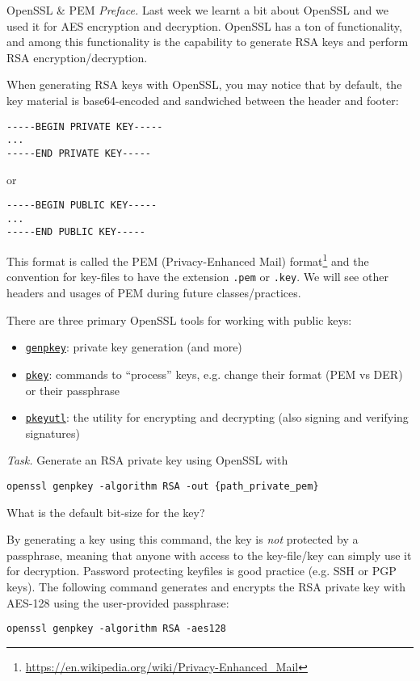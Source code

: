 \documentclass{practice}
\begin{document}
\begin{task}{OpenSSL \& PEM}
  \textit{Preface.}
  Last week we learnt a bit about OpenSSL and we used it for AES encryption and decryption.
  OpenSSL has a ton of functionality, and among this functionality is the capability to generate RSA keys and perform RSA encryption/decryption.

  When generating RSA keys with OpenSSL, you may notice that by default, the key material is base64-encoded and sandwiched between the header and footer:
  \begin{Verbatim}
-----BEGIN PRIVATE KEY-----
...
-----END PRIVATE KEY-----
  \end{Verbatim}
  or
  \begin{Verbatim}
-----BEGIN PUBLIC KEY-----
...
-----END PUBLIC KEY-----
  \end{Verbatim}
  This format is called the PEM (Privacy-Enhanced Mail) format\footnote{\url{https://en.wikipedia.org/wiki/Privacy-Enhanced_Mail}} and the convention for key-files to have the extension \texttt{.pem} or \texttt{.key}.
  We will see other headers and usages of PEM during future classes/practices.

  There are three primary OpenSSL tools for working with public keys:
  \begin{itemize}
    \item \href{https://docs.openssl.org/master/man1/openssl-genpkey/}{\texttt{genpkey}}: private key generation (and more)
    \item \href{https://docs.openssl.org/master/man1/openssl-pkey/}{\texttt{pkey}}: commands to \enquote{process} keys, e.g. change their format (PEM vs DER) or their passphrase
    \item \href{https://docs.openssl.org/master/man1/openssl-pkeyutl/}{\texttt{pkeyutl}}: the utility for encrypting and decrypting (also signing and verifying signatures)
  \end{itemize}

  \textit{Task.}
  Generate an RSA private key using OpenSSL with
  \begin{Verbatim}
openssl genpkey -algorithm RSA -out {path_private_pem}
  \end{Verbatim}
  What is the default bit-size for the key?

  \begin{tcolorbox}[title=Warning]
    By generating a key using this command, the key is \emph{not} protected by a passphrase, meaning that anyone with access to the key-file/key can simply use it for decryption.
    \tcblower
    Password protecting keyfiles is good practice (e.g. SSH or PGP keys).
    The following command generates and encrypts the RSA private key with AES-128 using the user-provided passphrase:
    \begin{Verbatim}
openssl genpkey -algorithm RSA -aes128
    \end{Verbatim}
  \end{tcolorbox}


\end{task}
\end{document}
